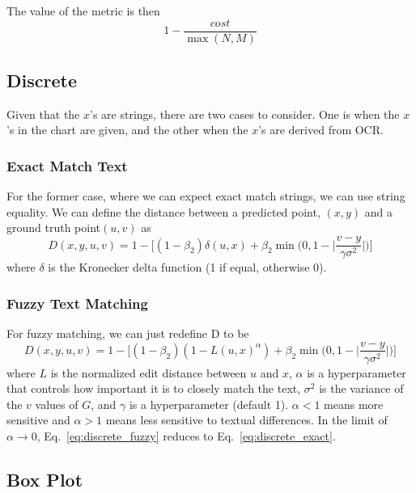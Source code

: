 \documentclass[a4paper,11pt]{scrartcl}
\begin{document}
The value of the metric is then 
\begin{equation} \label{eq:assign_cost}
1 - \frac{cost}{\max(N,M)}
\end{equation}


\subsection{Discrete}

Given that the $x$'s are strings, there are two cases to consider.
One is when the $x$'s in the chart are given, and the other when the $x$'s are derived from OCR.

\subsubsection{Exact Match Text}
\label{sec:discrete_exact}

For the former case, where we can expect exact match strings, we can use string equality.
We can define the distance between a predicted point, $(x, y)$ and a ground truth point$(u, v)$ as
\begin{equation} \label{eq:discrete_exact}
D(x,y,u,v) = 1 - \Big[(1 -\beta_2)\delta(u, x) + \beta_2 \min \Big(0, 1 - \Big| \frac{v - y}{\gamma\sigma^2} \Big| \Big)\Big]
\end{equation}
where $\delta$ is the Kronecker delta function (1 if equal, otherwise 0).

\subsubsection{Fuzzy Text Matching}

For fuzzy matching, we can just redefine D to be
\begin{equation} \label{eq:discrete_fuzzy}
D(x,y,u,v) =  1 - \Big[(1 -\beta_2)(1 - L(u, x)^\alpha) + \beta_2 \min \Big(0, 1 - \Big| \frac{v - y}{\gamma\sigma^2}\Big| \Big)\Big]
\end{equation}
where $L$ is the normalized edit distance between $u$ and $x$, $\alpha$ is a hyperparameter that controls how important it is to closely match the text, $\sigma^2$ is the variance of the $v$ values of $G$, and $\gamma$ is a hyperparameter (default 1).
$\alpha < 1$ means more sensitive and $\alpha > 1$ means less sensitive to textual differences.
In the limit of  $\alpha \rightarrow 0$, Eq.~\ref{eq:discrete_fuzzy} reduces to Eq.~\ref{eq:discrete_exact}.

\subsection{Box Plot}
\end{document}
